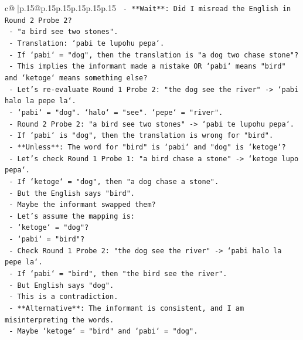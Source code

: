 \documentclass{article}
\begin{document}
{\begin{supertabular}{c@{$\;$}|p{.15\linewidth}@{}p{.15\linewidth}p{.15\linewidth}p{.15\linewidth}p{.15\linewidth}p{.15\linewidth}}
{{{\texttt{      {-} **Wait**: Did I misread the English in Round 2 Probe 2?} \\
\texttt{      {-} "a bird see two stones".} \\
\texttt{      {-} Translation: `pabi te lupohu pepa`.} \\
\texttt{      {-} If `pabi` = "dog", then the translation is "a dog two chase stone"?} \\
\texttt{      {-} This implies the informant made a mistake OR `pabi` means "bird" and `ketoge` means something else?} \\
\texttt{      {-} Let's re{-}evaluate Round 1 Probe 2: "the dog see the river" {-}> `pabi halo la pepe la`.} \\
\texttt{      {-} `pabi` = "dog". `halo` = "see". `pepe` = "river".} \\
\texttt{      {-} Round 2 Probe 2: "a bird see two stones" {-}> `pabi te lupohu pepa`.} \\
\texttt{      {-} If `pabi` is "dog", then the translation is wrong for "bird".} \\
\texttt{      {-} **Unless**: The word for "bird" is `pabi` and "dog" is `ketoge`?} \\
\texttt{      {-} Let's check Round 1 Probe 1: "a bird chase a stone" {-}> `ketoge lupo pepa`.} \\
\texttt{      {-} If `ketoge` = "dog", then "a dog chase a stone".} \\
\texttt{      {-} But the English says "bird".} \\
\texttt{      {-} Maybe the informant swapped them?} \\
\texttt{      {-} Let's assume the mapping is:} \\
\texttt{        {-} `ketoge` = "dog"?} \\
\texttt{        {-} `pabi` = "bird"?} \\
\texttt{      {-} Check Round 1 Probe 2: "the dog see the river" {-}> `pabi halo la pepe la`.} \\
\texttt{      {-} If `pabi` = "bird", then "the bird see the river".} \\
\texttt{      {-} But English says "dog".} \\
\texttt{      {-} This is a contradiction.} \\
\texttt{      {-} **Alternative**: The informant is consistent, and I am misinterpreting the words.} \\
\texttt{      {-} Maybe `ketoge` = "bird" and `pabi` = "dog".} \\
}}}
\end{supertabular}}
\end{document}
